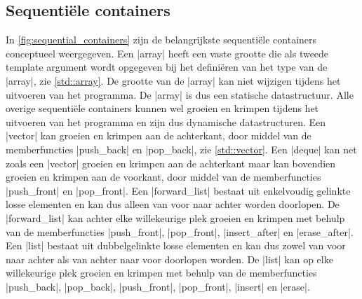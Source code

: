 \begin{cpplstShortInline}
\section{Sequentiële containers}
\label{sec:seqcon}
In \cref{fig:sequential_containers} zijn de belangrijkste sequentiële containers conceptueel weergegeven.
Een |array| heeft een vaste grootte die als tweede template argument wordt opgegeven bij het definiëren van het type van de |array|, zie \cref{std::array}.
De grootte van de |array| kan niet wijzigen tijdens het uitvoeren van het programma.
De |array| is dus een statische datastructuur.
Alle overige sequentiële containers kunnen wel groeien en krimpen tijdens het uitvoeren van het programma en zijn dus dynamische datastructuren.
Een |vector| kan groeien en krimpen aan de achterkant, door middel van de memberfuncties |push_back| en |pop_back|, zie \cref{std::vector}.
Een |deque| kan net zoals een |vector| groeien en krimpen aan de achterkant maar kan bovendien groeien en krimpen aan de voorkant, door middel van de memberfuncties |push_front| en |pop_front|.
Een |forward_list| bestaat uit enkelvoudig gelinkte losse elementen en kan dus alleen van voor naar achter worden doorlopen.
De |forward_list| kan achter elke willekeurige plek groeien en krimpen met behulp van de memberfuncties |push_front|, |pop_front|, |insert_after| en |erase_after|.
Een |list| bestaat uit dubbelgelinkte losse elementen en kan dus zowel van voor naar achter als van achter naar voor doorlopen worden.
De |list| kan op elke willekeurige plek groeien en krimpen met behulp van de memberfuncties |push_back|, |pop_back|, |push_front|, |pop_front|, |insert| en |erase|.


\newlength{\boxWidthOne}
\newlength{\boxWidthTwo}
\newlength{\boxWidthThree}
\newlength{\boxWidthFour}
\newcommand{\nietOne}{\parbox{\boxWidthOne}{\centering --}}
\newcommand{\nietTwo}{\parbox{\boxWidthTwo}{\centering --}}
\newcommand{\nietThree}{\parbox{\boxWidthThree}{\centering --}}
\newcommand{\nietFour}{\parbox{\boxWidthFour}{\centering --}}
\newcommand{\boxHeight}{12mm}


\end{cpplstShortInline}
